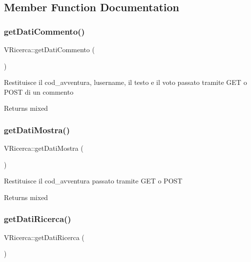 \subsection{Member Function Documentation}
\mbox{\label{class_v_ricerca_a6effafa27453d04f9e50d6f4cf690732}} 
\subsubsection{\texorpdfstring{get\+Dati\+Commento()}{getDatiCommento()}}
{\footnotesize\ttfamily V\+Ricerca\+::get\+Dati\+Commento (\begin{DoxyParamCaption}{ }\end{DoxyParamCaption})}

Restituisce il cod\+\_\+avventura, l\textquotesingle{}username, il testo e il voto passato tramite G\+ET o P\+O\+ST di un commento

\begin{DoxyReturn}{Returns}
mixed 
\end{DoxyReturn}
\mbox{\label{class_v_ricerca_af32f2ee10d133b234eeb8bd3359569a1}} 
\subsubsection{\texorpdfstring{get\+Dati\+Mostra()}{getDatiMostra()}}
{\footnotesize\ttfamily V\+Ricerca\+::get\+Dati\+Mostra (\begin{DoxyParamCaption}{ }\end{DoxyParamCaption})}

Restituisce il cod\+\_\+avventura passato tramite G\+ET o P\+O\+ST

\begin{DoxyReturn}{Returns}
mixed 
\end{DoxyReturn}
\mbox{\label{class_v_ricerca_ac0f1b275ec5c9e97bf01548ee679102a}} 
\subsubsection{\texorpdfstring{get\+Dati\+Ricerca()}{getDatiRicerca()}}
{\footnotesize\ttfamily V\+Ricerca\+::get\+Dati\+Ricerca (\begin{DoxyParamCaption}{ }\end{DoxyParamCaption})}

